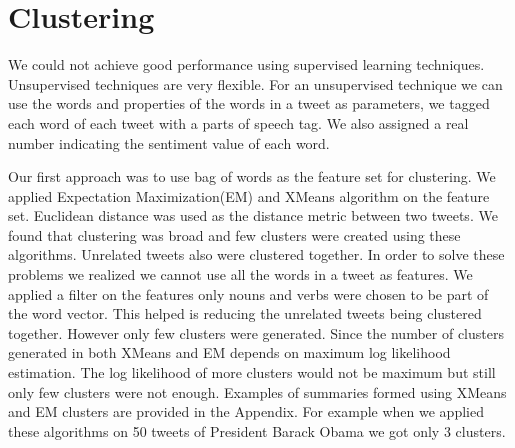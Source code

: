 \section{Clustering}
We could not achieve good performance using supervised learning techniques. Unsupervised techniques are very flexible. For an unsupervised technique we can use the words and properties of the words in a tweet as parameters, we tagged each word of each tweet with a parts of speech tag. We also assigned a real number indicating the sentiment value of each word. 

Our first approach was to use bag of words as the feature set for clustering. We applied Expectation Maximization(EM)\cite{Gupta:2010:DNC:1798337.1798433} and XMeans \cite{Pelleg:2000:XEK:645529.657808} algorithm on the feature set. Euclidean distance was used as the distance metric between two tweets. We found that clustering was broad and few clusters were created using these algorithms. Unrelated tweets also were clustered together. In order to solve these problems we realized we cannot use all the words in a tweet as features. We applied a filter on the features only nouns and verbs were chosen to be part of the word vector. This helped is reducing the unrelated tweets being clustered together. However only few clusters were generated. Since the number of clusters generated in both XMeans and EM depends on maximum log likelihood estimation. The log likelihood of more clusters would not be maximum but still only few clusters were not enough. Examples of summaries formed using XMeans and EM clusters are provided in the Appendix. For example when we applied these algorithms on 50 tweets of President Barack Obama we got only 3 clusters. 


